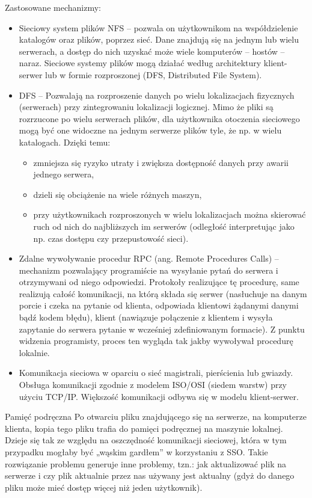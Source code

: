 Zastosowane mechanizmy:
\begin{itemize}
\item Sieciowy system plików NFS – pozwala on użytkownikom na współdzielenie katalogów oraz plików, poprzez sieć. Dane znajdują się na jednym lub wielu serwerach, a dostęp do nich uzyskać może wiele komputerów – hostów – naraz. Sieciowe systemy plików mogą działać według architektury klient-serwer lub w formie rozproszonej (DFS, Distributed File System).
\item DFS – Pozwalają na rozproszenie danych po wielu lokalizacjach fizycznych (serwerach) przy zintegrowaniu lokalizacji logicznej. Mimo że pliki są rozrzucone po wielu serwerach plików, dla użytkownika otoczenia sieciowego mogą być one widoczne na jednym serwerze plików tyle, że np. w wielu katalogach. Dzięki temu:
\begin{itemize}
\item   zmniejsza się ryzyko utraty i zwiększa dostępność danych przy awarii jednego serwera,
\item   dzieli się obciążenie na wiele różnych maszyn,
\item  przy użytkownikach rozproszonych w wielu lokalizacjach można skierować ruch od nich do najbliższych im serwerów (odległość interpretując jako np. czas dostępu czy przepustowość sieci).
\end{itemize}
\item Zdalne wywoływanie procedur RPC (ang. Remote Procedures Calls) – mechanizm pozwalający programiście na wysyłanie pytań do serwera i otrzymywani od niego odpowiedzi. Protokoły realizujące tę procedurę, same realizują całość komunikacji, na którą składa się serwer (nasłuchuje na danym porcie i czeka na pytanie od klienta, odpowiada klientowi żądanymi danymi bądź kodem błędu), klient (nawiązuje połączenie z klientem i wysyła zapytanie do serwera pytanie w wcześniej zdefiniowanym formacie). Z punktu widzenia programisty, proces ten wygląda tak jakby wywoływał procedurę lokalnie.
\item Komunikacja sieciowa w oparciu o sieć magistrali, pierścienia lub gwiazdy. Obsługa komunikacji zgodnie z modelem ISO/OSI (siedem warstw) przy użyciu TCP/IP. Większość komunikacji odbywa się w modelu klient-serwer.
\end{itemize}

Pamięć podręczna
Po otwarciu pliku znajdującego się na serwerze, na komputerze klienta, kopia tego pliku trafia do pamięci podręcznej na maszynie lokalnej. Dzieje się tak ze względu na oszczędność komunikacji sieciowej, która w tym przypadku mogłaby być „wąskim gardłem” w korzystaniu z SSO. Takie rozwiązanie problemu generuje inne problemy, tzn.: jak aktualizować plik na serwerze i czy plik aktualnie przez nas używany jest aktualny (gdyż do danego pliku może mieć dostęp więcej niż jeden użytkownik).
 
